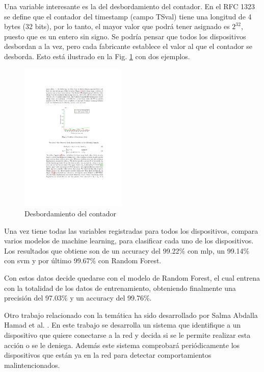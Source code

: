 Una variable interesante es la del desbordamiento del contador. En el RFC 1323 \cite{RFC1323} se define que el contador del timestamp (campo TSval) tiene una longitud de 4 bytes (32 bits), por lo tanto, el mayor valor que podrá tener asignado es $2^{32}$, puesto que es un entero sin signo. Se podría pensar que todos los dispositivos desbordan a la vez, pero cada fabricante establece el valor al que el contador se desborda. Esto está ilustrado en la Fig. \ref{fig:cern_ts_overflow} con dos ejemplos.

\begin{figure}[htpb!]
    \centering
    \includegraphics[width=0.45\textwidth]{images/CERN-timestamp_overflow}
    \caption{Desbordamiento del contador \cite{oser2018identifying}}
    \label{fig:cern_ts_overflow}
\end{figure}

Una vez tiene todas las variables registradas para todos los dispositivos, compara varios modelos de machine learning, para clasificar cada uno de los dispositivos. Los resultados que obtiene son de un accuracy del 99.22\% con \acrshort{mlp}, un 99.14\% con \acrshort{svm} y por último 99.67\% con Random Forest.

Con estos datos decide quedarse con el modelo de Random Forest, el cual entrena con la totalidad de los datos de entrenamiento, obteniendo finalmente una precisión del 97.03\% y un accuracy del 99.76\%.

Otro trabajo relacionado con la temática ha sido desarrollado por Salma Abdalla Hamad et al. \cite{hamad2019iot}. En este trabajo se desarrolla un sistema que identifique a un dispositivo que quiere conectarse a la red y decida si se le permite realizar esta acción o se le deniega. Además este sistema comprobará periódicamente los dispositivos que están ya en la red para detectar comportamientos malintencionados. 

